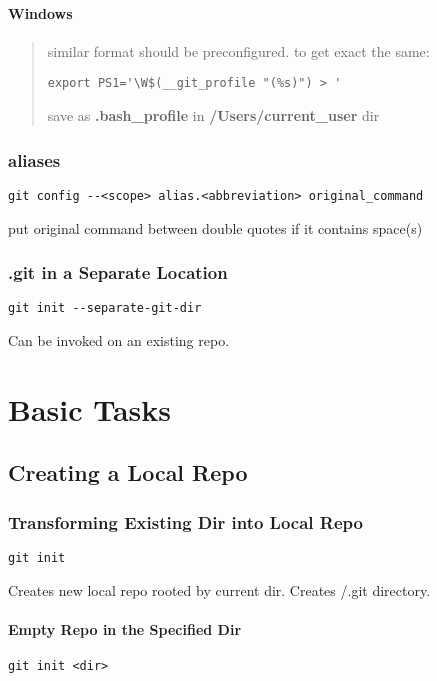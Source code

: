 \documentclass{report}
\begin{document}
\subsection*{Windows}
\begin{quote}
similar format should be preconfigured. to get exact the same:
\begin{verbatim}
export PS1='\W$(__git_profile "(%s)") > '
\end{verbatim}
save as \textbf{.bash\_profile} in \textbf{/Users/current\_user} dir
\end{quote}


\section{aliases}
\begin{verbatim}
git config --<scope> alias.<abbreviation> original_command
\end{verbatim}
put original command between double quotes if it contains space(s)


\section{.git in a Separate Location}
\begin{verbatim}
git init --separate-git-dir
\end{verbatim}
Can be invoked on an existing repo.




\part{Basic Tasks}



\chapter{Creating a Local Repo}


\section{Transforming Existing Dir into Local Repo}
\begin{verbatim}
git init
\end{verbatim}
Creates new local repo rooted by current dir. Creates /.git directory.

\subsection{Empty Repo in the Specified Dir}
\begin{verbatim}
git init <dir>
\end{verbatim}
\end{document}
